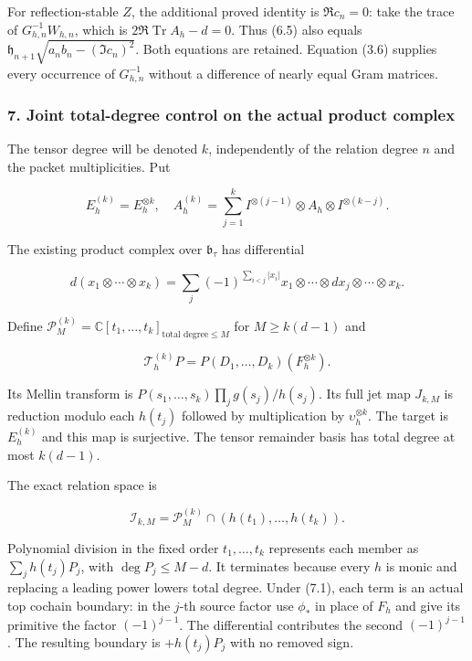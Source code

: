 For reflection-stable \(Z\), the additional proved identity is
\(\Re c_n=0\): take the trace of \(G_{h,n}^{-1}W_{h,n}\), which is
\(2\Re\operatorname{Tr}A_h-d=0\). Thus (6.5) also equals
\(\mathfrak h_{n+1}\sqrt{a_nb_n-(\Im c_n)^2}\). Both equations are
retained. Equation (3.6) supplies every occurrence of \(G_{h,n}^{-1}\)
without a difference of nearly equal Gram matrices.

\subsubsection{7. Joint total-degree control on the actual product
complex}\label{pr_14:joint-total-degree-control-on-the-actual-product-complex}

The tensor degree will be denoted \(k\), independently of the relation
degree \(n\) and the packet multiplicities. Put

\[E_h^{(k)}=E_h^{\otimes k},\quad
A_h^{(k)}=\sum_{j=1}^k I^{\otimes(j-1)}\otimes A_h\otimes I^{\otimes(k-j)}.\]

The existing product complex over \(\mathfrak b_\tau\) has differential

\[d(x_1\otimes\cdots\otimes x_k)=\sum_j(-1)^{\sum_{i<j}|x_i|}x_1\otimes\cdots\otimes dx_j\otimes\cdots\otimes x_k.\]

Define
\(\mathcal P_M^{(k)}=\mathbb C[t_1,\ldots,t_k]_{\text{total degree}\le M}\)
for \(M\ge k(d-1)\) and

\[\mathcal T_h^{(k)}P=P(D_1,\ldots,D_k)(F_h^{\otimes k}).\tag{7.1}\]

Its Mellin transform is \(P(s_1,\ldots,s_k)\prod_j g(s_j)/h(s_j)\). Its
full jet map \(J_{k,M}\) is reduction modulo each \(h(t_j)\) followed by
multiplication by \(\upsilon_h^{\otimes k}\). The target is
\(E_h^{(k)}\) and this map is surjective. The tensor remainder basis has
total degree at most \(k(d-1)\).

The exact relation space is

\[\mathcal I_{k,M}=\mathcal P_M^{(k)}\cap(h(t_1),\ldots,h(t_k)).\tag{7.2}\]

Polynomial division in the fixed order \(t_1,\ldots,t_k\) represents
each member as \(\sum_j h(t_j)P_j\), with \(\deg P_j\le M-d\). It
terminates because every \(h\) is monic and replacing a leading power
lowers total degree. Under (7.1), each term is an actual top cochain
boundary: in the \(j\)-th source factor use \(\phi_*\) in place of
\(F_h\) and give its primitive the factor \((-1)^{j-1}\). The
differential contributes the second \((-1)^{j-1}\). The resulting
boundary is \(+h(t_j)P_j\) with no removed sign.

